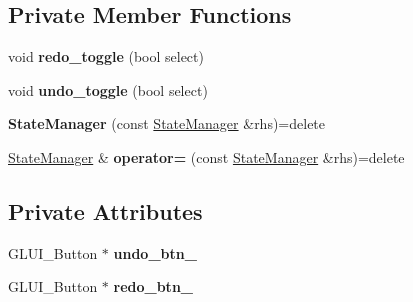 \subsection*{Private Member Functions}
\begin{DoxyCompactItemize}
\item 
void {\bfseries redo\+\_\+toggle} (bool select)\hypertarget{classimage__tools_1_1StateManager_af5b298291a12460eb3ab6c7af9c16e70}{}\label{classimage__tools_1_1StateManager_af5b298291a12460eb3ab6c7af9c16e70}

\item 
void {\bfseries undo\+\_\+toggle} (bool select)\hypertarget{classimage__tools_1_1StateManager_ab617fd412a4fa0d757cd96f5bf836dd0}{}\label{classimage__tools_1_1StateManager_ab617fd412a4fa0d757cd96f5bf836dd0}

\item 
{\bfseries State\+Manager} (const \hyperlink{classimage__tools_1_1StateManager}{State\+Manager} \&rhs)=delete\hypertarget{classimage__tools_1_1StateManager_ab3202a4aaa1fbf6415597218f6182530}{}\label{classimage__tools_1_1StateManager_ab3202a4aaa1fbf6415597218f6182530}

\item 
\hyperlink{classimage__tools_1_1StateManager}{State\+Manager} \& {\bfseries operator=} (const \hyperlink{classimage__tools_1_1StateManager}{State\+Manager} \&rhs)=delete\hypertarget{classimage__tools_1_1StateManager_a84c8b7a722a9e41da3569ad1d3a05f21}{}\label{classimage__tools_1_1StateManager_a84c8b7a722a9e41da3569ad1d3a05f21}

\end{DoxyCompactItemize}
\subsection*{Private Attributes}
\begin{DoxyCompactItemize}
\item 
G\+L\+U\+I\+\_\+\+Button $\ast$ {\bfseries undo\+\_\+btn\+\_\+}\hypertarget{classimage__tools_1_1StateManager_adbe2820d914eb5ba08de3dfcc61aa82d}{}\label{classimage__tools_1_1StateManager_adbe2820d914eb5ba08de3dfcc61aa82d}

\item 
G\+L\+U\+I\+\_\+\+Button $\ast$ {\bfseries redo\+\_\+btn\+\_\+}\hypertarget{classimage__tools_1_1StateManager_a6fd0aef5e8fc7b52cf6f9de416ac4825}{}\label{classimage__tools_1_1StateManager_a6fd0aef5e8fc7b52cf6f9de416ac4825}

\end{DoxyCompactItemize}


